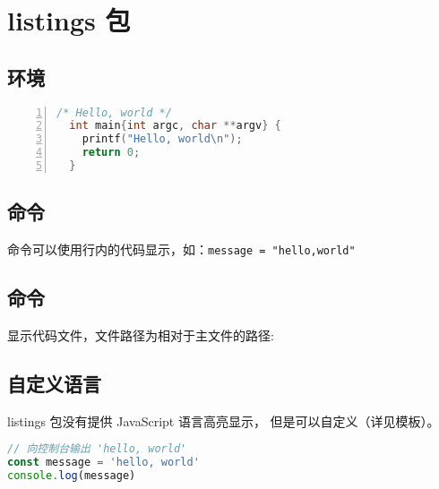 \section{listings 包}

\subsection{\protect{} 环境}

\begin{texcode}
\begin{lstlisting}[language=C,caption={C/C++ 语言},numbers=left]
  /* Hello, world */
  int main{int argc, char **argv} {
    printf("Hello, world\n");
    return 0;
  }
\end{lstlisting}
\end{texcode}

\subsection{\protect{} 命令}

 命令可以使用行内的代码显示，如：\texttt{\lstinline|message = "hello,world"|}

\subsection{\protect{} 命令}

显示代码文件，文件路径为相对于主文件的路径:

\begin{texcode}

\end{texcode}

\subsection{自定义语言}

listings 包没有提供 JavaScript 语言高亮显示， 但是可以自定义（详见模板）。

\begin{texcode}
\begin{lstlisting}[language=js,caption={JavaScript 语言}]
// 向控制台输出 'hello, world'
const message = 'hello, world'
console.log(message)
\end{lstlisting}
\end{texcode}

